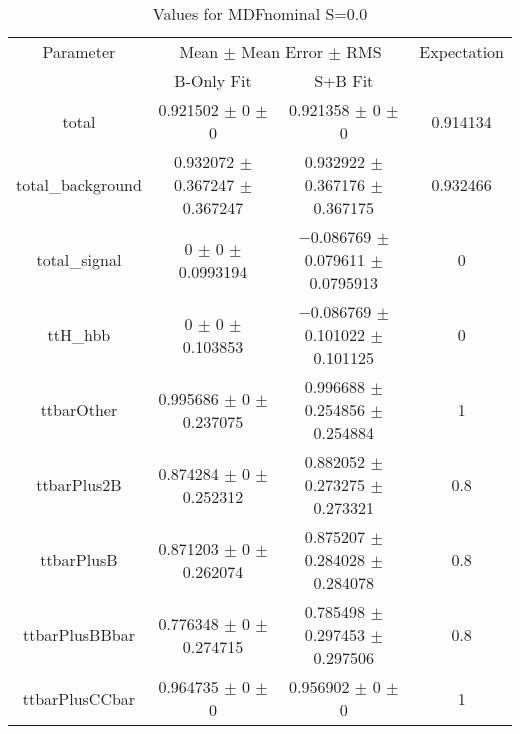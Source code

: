 \begin{table}
\centering
\caption{Values for MDFnominal S=0.0}
\begin{tabular}{cccc}
\toprule
Parameter & \multicolumn{2}{c}{Mean $\pm$ Mean Error $\pm$ RMS} & Expectation\\
 & B-Only Fit & S+B Fit & \\
\midrule
total & \num{0.921502} $\pm$ \num{0} $\pm$ \num{0} & \num{0.921358} $\pm$ \num{0} $\pm$ \num{0} & \num{0.914134}\\
total\_background & \num{0.932072} $\pm$ \num{0.367247} $\pm$ \num{0.367247} & \num{0.932922} $\pm$ \num{0.367176} $\pm$ \num{0.367175} & \num{0.932466}\\
total\_signal & \num{0} $\pm$ \num{0} $\pm$ \num{0.0993194} & \num{-0.086769} $\pm$ \num{0.079611} $\pm$ \num{0.0795913} & \num{0}\\
ttH\_hbb & \num{0} $\pm$ \num{0} $\pm$ \num{0.103853} & \num{-0.086769} $\pm$ \num{0.101022} $\pm$ \num{0.101125} & \num{0}\\
ttbarOther & \num{0.995686} $\pm$ \num{0} $\pm$ \num{0.237075} & \num{0.996688} $\pm$ \num{0.254856} $\pm$ \num{0.254884} & \num{1}\\
ttbarPlus2B & \num{0.874284} $\pm$ \num{0} $\pm$ \num{0.252312} & \num{0.882052} $\pm$ \num{0.273275} $\pm$ \num{0.273321} & \num{0.8}\\
ttbarPlusB & \num{0.871203} $\pm$ \num{0} $\pm$ \num{0.262074} & \num{0.875207} $\pm$ \num{0.284028} $\pm$ \num{0.284078} & \num{0.8}\\
ttbarPlusBBbar & \num{0.776348} $\pm$ \num{0} $\pm$ \num{0.274715} & \num{0.785498} $\pm$ \num{0.297453} $\pm$ \num{0.297506} & \num{0.8}\\
ttbarPlusCCbar & \num{0.964735} $\pm$ \num{0} $\pm$ \num{0} & \num{0.956902} $\pm$ \num{0} $\pm$ \num{0} & \num{1}\\
\bottomrule
\end{tabular}
\end{table}